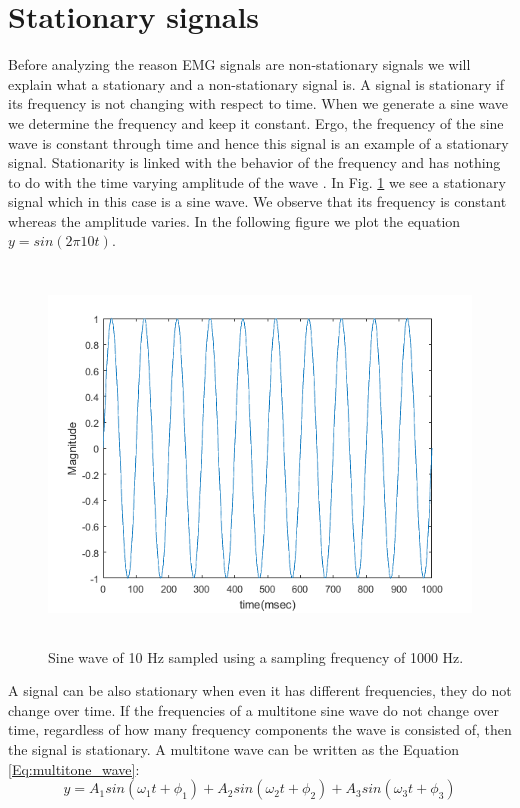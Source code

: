 \section{Stationary signals}
Before analyzing the reason EMG signals are non-stationary signals we will explain what  a stationary and a non-stationary signal is. A signal is stationary if its frequency is not changing with respect to time. When we generate a sine wave we determine the frequency and keep it constant. Ergo, the frequency of the sine wave is constant through time and hence this signal is an example of a stationary signal. Stationarity is linked with the behavior of the frequency and has nothing to do with the time varying amplitude of the wave \cite{sakshat_virtual_labs}. In Fig. \ref{Fig:singletone} we see a stationary signal which in this case is a sine wave. We observe that its frequency is constant whereas the amplitude varies. In the following figure we plot the equation $y = sin(2\pi10t)$.
\begin{figure}[H]
\includegraphics[width=12cm,height=10cm,center,keepaspectratio]{figures/singletone}
\caption{Sine wave of 10 Hz sampled using a sampling frequency of 1000 Hz.}
\label{Fig:singletone}
\end{figure}
A signal can be also stationary when even it has different frequencies, they do not change over time. If the frequencies of a multitone sine wave do not change over time, regardless of how many frequency components the wave is consisted of, then the signal is stationary. A multitone wave can be written as the Equation \ref{Eq:multitone_wave}:
\begin{equation}
y = A_1sin(\omega_1t + \phi_1) +A_2sin(\omega_2 t + \phi_2) +A_3sin(\omega_3 t + \phi_3)
\label{Eq:multitone_wave}
\end{equation}
